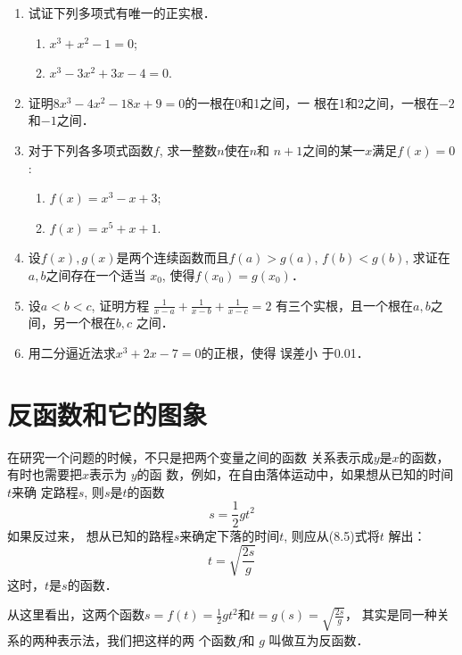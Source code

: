 \begin{enumerate}
\item 试证下列多项式有唯一的正实根．
\begin{multicols}{2}
    \begin{enumerate}
        \item $x^3+x^2-1=0$;
        \item $x^3-3x^2+3x-4=0$.
\end{enumerate}
\end{multicols}
\item 证明$8x^3-4x^2-18x+9=0$的一根在0和1之间，一
根在1和2之间，一根在$-2$和$-1$之间．
\item 对于下列各多项式函数$f$, 求一整数$n$使在$n$和
$n+1$之间的某一$x$满足$f(x)=0$:
\begin{multicols}{2}
    \begin{enumerate}
        \item $f(x)=x^3-x+3$;
        \item  $f(x)=x^5+x+1$.
\end{enumerate}
\end{multicols}
\item 设$f(x),g(x)$是两个连续函数而且$f(a)>
g(a)$, $f(b)<g(b)$, 求证在$a,b$之间存在一个适当
$x_0$, 使得$f(x_0)=g(x_0)$．

\item 设$a<b<c$, 证明方程
$\frac{1}{x-a}+\frac{1}{x-b}+\frac{1}{x-c}=2$
有三个实根，且一个根在$a,b$之间，另一个根在$b,c$
之间．
\item 用二分逼近法求$x^3+2x-7=0$的正根，使得 误差小
于0.01．

\end{enumerate}


\section{反函数和它的图象}

在研究一个问题的时候，不只是把两个变量之间的函数
关系表示成$y$是$x$的函数，有时也需要把$x$表示为 $y$的函
数，例如，在自由落体运动中，如果想从已知的时间$t$来确
定路程$s$, 则$s$是$t$的函数
\begin{equation}
    s=\frac{1}{2}gt^2
\end{equation}
如果反过来，
想从已知的路程$s$来确定下落的时间$t$, 则应从(8.5)式将$t$
解出：
\begin{equation}
    t=\sqrt{\frac{2s}{g}}
\end{equation}
这时，$t$是$s$的函数．

从这里看出，这两个函数$s=f(t)=\frac{1}{2}gt^2$和$t=g(s)=
\sqrt{\frac{2s}{g}}$，
其实是同一种关系的两种表示法，我们把这样的两
个函数$f$和
$g$ 叫做互为反函数．

